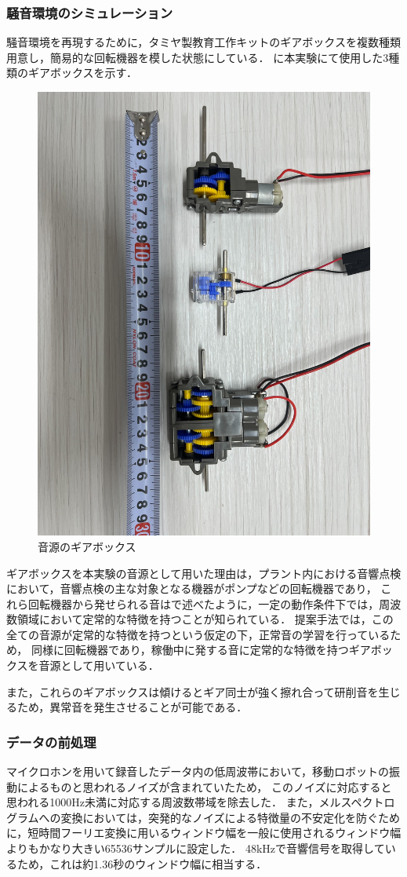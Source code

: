 \documentclass[../main]{subfiles}
\begin{document}
\subsubsection{騒音環境のシミュレーション} \label{subsubsec:noise_simulation}
騒音環境を再現するために，タミヤ製教育工作キットのギアボックスを複数種類用意し，簡易的な回転機器を模した状態にしている．
に本実験にて使用した3種類のギアボックスを示す．


\begin{figure}[t]
  \centering
  \includegraphics[angle=90,keepaspectratio, width=0.7\linewidth]{chap4/gearbox.jpg}
  \caption{音源のギアボックス}
  \label{fig:gearbox}
\end{figure}

ギアボックスを本実験の音源として用いた理由は，プラント内における音響点検において，音響点検の主な対象となる機器がポンプなどの回転機器であり，
これら回転機器から発せられる音はで述べたように，一定の動作条件下では，周波数領域において定常的な特徴を持つことが知られている．
提案手法では，この全ての音源が定常的な特徴を持つという仮定の下，正常音の学習を行っているため，
同様に回転機器であり，稼働中に発する音に定常的な特徴を持つギアボックスを音源として用いている．

また，これらのギアボックスは傾けるとギア同士が強く擦れ合って研削音を生じるため，異常音を発生させることが可能である．
\subsubsection{データの前処理} \label{subsec:data_preprocessing}
マイクロホンを用いて録音したデータ内の低周波帯において，移動ロボットの振動によるものと思われるノイズが含まれていたため，
このノイズに対応すると思われる1000Hz未満に対応する周波数帯域を除去した．
また，メルスペクトログラムへの変換においては，突発的なノイズによる特徴量の不安定化を防ぐために，短時間フーリエ変換に用いるウィンドウ幅を一般に使用されるウィンドウ幅よりもかなり大きい65536サンプルに設定した．
48kHzで音響信号を取得しているため，これは約1.36秒のウィンドウ幅に相当する．
\end{document}
